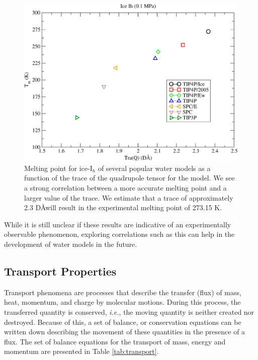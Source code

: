 \begin{figure}
\includegraphics[width = \linewidth]{Figures/Tm_Ih_TraQ_plot.pdf}
\caption{\label{fig:TraQ} Melting point for ice-I$_h$ of several popular water models as a function of the trace of the quadrupole tensor for the model. We see a strong correlation between a more accurate melting point and a larger value of the trace. We estimate that a trace of approximately 2.3 D\AA will result in the experimental melting point of 273.15 K.}
\end{figure}

While it is still unclear if these results are indicative of an
experimentally observable phenomenon, exploring correlations such as
this can help in the development of water models in the future. 


\subsection{Transport Properties}
Transport phenomena are processes that describe the transfer (flux) of
mass, heat, momentum, and charge by molecular motions. During this
process, the transferred quantity is conserved, \textit{i.e.}, the
moving quantity is neither created nor destroyed. Because of this, a set
of balance, or conservation equations can be written down describing
the movement of these quantities in the presence of a flux. The set of
balance equations for the transport of mass, energy and momentum are
presented in Table \ref{tab:transport}. 


